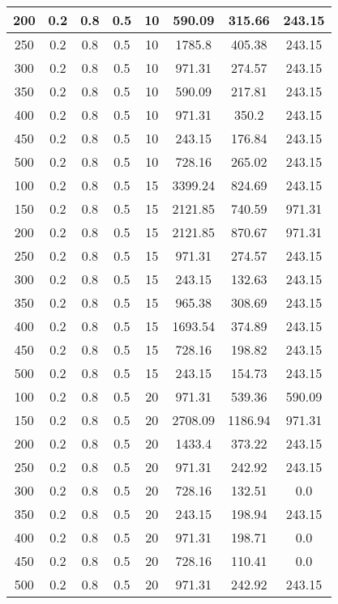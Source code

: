 \documentclass[a4paper, 12pt]{extreport}
\begin{document}
\begin{itemize}
\begin{longtable}{|c|c|c|c|c|c|c|c|}
			200 & 0.2 & 0.8 & 0.5 & 10 & 590.09 & 315.66 & 243.15 \\\hline
			250 & 0.2 & 0.8 & 0.5 & 10 & 1785.8 & 405.38 & 243.15 \\\hline
			300 & 0.2 & 0.8 & 0.5 & 10 & 971.31 & 274.57 & 243.15 \\\hline
			350 & 0.2 & 0.8 & 0.5 & 10 & 590.09 & 217.81 & 243.15 \\\hline
			400 & 0.2 & 0.8 & 0.5 & 10 & 971.31 & 350.2 & 243.15 \\\hline
			450 & 0.2 & 0.8 & 0.5 & 10 & 243.15 & 176.84 & 243.15 \\\hline
			500 & 0.2 & 0.8 & 0.5 & 10 & 728.16 & 265.02 & 243.15 \\\hline
			100 & 0.2 & 0.8 & 0.5 & 15 & 3399.24 & 824.69 & 243.15 \\\hline
			150 & 0.2 & 0.8 & 0.5 & 15 & 2121.85 & 740.59 & 971.31 \\\hline
			200 & 0.2 & 0.8 & 0.5 & 15 & 2121.85 & 870.67 & 971.31 \\\hline
			250 & 0.2 & 0.8 & 0.5 & 15 & 971.31 & 274.57 & 243.15 \\\hline
			300 & 0.2 & 0.8 & 0.5 & 15 & 243.15 & 132.63 & 243.15 \\\hline
			350 & 0.2 & 0.8 & 0.5 & 15 & 965.38 & 308.69 & 243.15 \\\hline
			400 & 0.2 & 0.8 & 0.5 & 15 & 1693.54 & 374.89 & 243.15 \\\hline
			450 & 0.2 & 0.8 & 0.5 & 15 & 728.16 & 198.82 & 243.15 \\\hline
			500 & 0.2 & 0.8 & 0.5 & 15 & 243.15 & 154.73 & 243.15 \\\hline
			100 & 0.2 & 0.8 & 0.5 & 20 & 971.31 & 539.36 & 590.09 \\\hline
			150 & 0.2 & 0.8 & 0.5 & 20 & 2708.09 & 1186.94 & 971.31 \\\hline
			200 & 0.2 & 0.8 & 0.5 & 20 & 1433.4 & 373.22 & 243.15 \\\hline
			250 & 0.2 & 0.8 & 0.5 & 20 & 971.31 & 242.92 & 243.15 \\\hline
			300 & 0.2 & 0.8 & 0.5 & 20 & 728.16 & 132.51 & 0.0 \\\hline
			350 & 0.2 & 0.8 & 0.5 & 20 & 243.15 & 198.94 & 243.15 \\\hline
			400 & 0.2 & 0.8 & 0.5 & 20 & 971.31 & 198.71 & 0.0 \\\hline
			450 & 0.2 & 0.8 & 0.5 & 20 & 728.16 & 110.41 & 0.0 \\\hline
			500 & 0.2 & 0.8 & 0.5 & 20 & 971.31 & 242.92 & 243.15 \\\hline

\end{longtable}
\end{itemize}
\end{document}
